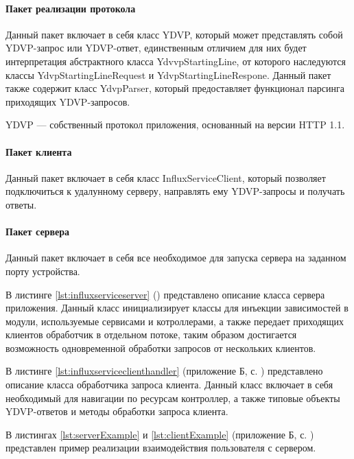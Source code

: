 \paragraph{Пакет реализации протокола \newline}
Данный пакет включает в себя класс YDVP, который может представлять собой YDVP-запрос или YDVP-ответ, единственным отличием для них будет интерпретация абстрактного класса YdvvpStartingLine, от которого наследуются классы YdvpStartingLineRequest и YdvpStartingLineRespone. Данный пакет также содержит класс YdvpParser, который предоставляет функционал парсинга приходящих YDVP-запросов.

YDVP --- собственный протокол приложения, основанный на версии \newline HTTP 1.1.

\paragraph{Пакет клиента \newline}
Данный пакет включает в себя класс InfluxServiceClient, который позволяет подключиться к удалунному серверу, направлять ему YDVP-запросы и получать ответы.

\paragraph{Пакет сервера \newline}

Данный пакет включает в себя все необходимое для запуска сервера на заданном порту устройства.

В листинге \ref{lst:influxserviceserver} () представлено описание класса сервера приложения. Данный класс инициализирует классы для инъекции зависимостей в модули, используемые сервисами и котроллерами, а также передает приходящих клиентов обработчик в отдельном потоке, таким образом достигается возможность одновременной обработки запросов от нескольких клиентов.

В листинге \ref{lst:influxserviceclienthandler} (приложение Б, с. \pageref{chp:application-b}) представлено описание класса обработчика запроса клиента. Данный класс включает в себя необходимый для навигации по ресурсам контроллер, а также типовые объекты YDVP-ответов и методы обработки запроса клиента.

В листингах \ref{lst:serverExample} и \ref{lst:clientExample} (приложение Б, с. \pageref{chp:application-b}) представлен пример реализации взаимодействия пользователя с сервером.

